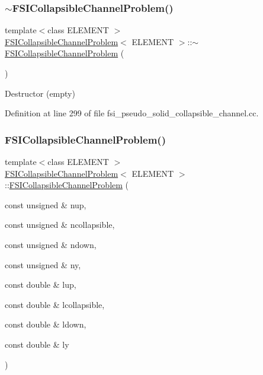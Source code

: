 \subsubsection{\texorpdfstring{$\sim$\+F\+S\+I\+Collapsible\+Channel\+Problem()}{~FSICollapsibleChannelProblem()}\hspace{0.1cm}{\footnotesize\ttfamily [3/4]}}
{\footnotesize\ttfamily template$<$class E\+L\+E\+M\+E\+NT $>$ \\
\hyperlink{classFSICollapsibleChannelProblem}{F\+S\+I\+Collapsible\+Channel\+Problem}$<$ E\+L\+E\+M\+E\+NT $>$\+::$\sim$\hyperlink{classFSICollapsibleChannelProblem}{F\+S\+I\+Collapsible\+Channel\+Problem} (\begin{DoxyParamCaption}{ }\end{DoxyParamCaption})\hspace{0.3cm}{\ttfamily [inline]}}



Destructor (empty) 



Definition at line 299 of file fsi\+\_\+pseudo\+\_\+solid\+\_\+collapsible\+\_\+channel.\+cc.

\mbox{\label{classFSICollapsibleChannelProblem_afe14ae0d2bdfc9a15969c9bdcd6e2512}} 
\subsubsection{\texorpdfstring{F\+S\+I\+Collapsible\+Channel\+Problem()}{FSICollapsibleChannelProblem()}\hspace{0.1cm}{\footnotesize\ttfamily [4/4]}}
{\footnotesize\ttfamily template$<$class E\+L\+E\+M\+E\+NT $>$ \\
\hyperlink{classFSICollapsibleChannelProblem}{F\+S\+I\+Collapsible\+Channel\+Problem}$<$ E\+L\+E\+M\+E\+NT $>$\+::\hyperlink{classFSICollapsibleChannelProblem}{F\+S\+I\+Collapsible\+Channel\+Problem} (\begin{DoxyParamCaption}\item[{const unsigned \&}]{nup,  }\item[{const unsigned \&}]{ncollapsible,  }\item[{const unsigned \&}]{ndown,  }\item[{const unsigned \&}]{ny,  }\item[{const double \&}]{lup,  }\item[{const double \&}]{lcollapsible,  }\item[{const double \&}]{ldown,  }\item[{const double \&}]{ly }\end{DoxyParamCaption})}



